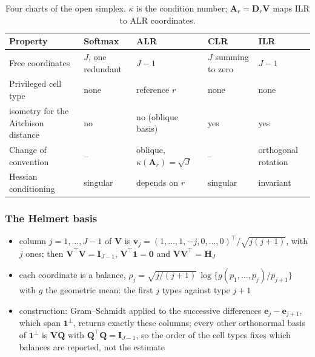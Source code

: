 \begin{table}[ht]
  \centering
  \small
  \caption{Four charts of the open simplex. \(\kappa\) is the condition number; \(\boldsymbol{A}_{r}=\boldsymbol{D}_{r}\mathbf{V}\)
    maps ILR to ALR coordinates.}
  \label{tab:charts}
  \begin{tabular}{@{}>{\raggedright\arraybackslash}p{}>{\raggedright\arraybackslash}p{}>{\raggedright\arraybackslash}p{}>{\raggedright\arraybackslash}p{}>{\raggedright\arraybackslash}p{}@{}}
    \toprule
    Property & Softmax & ALR & CLR & ILR \\
    \midrule
    Free coordinates & \(J\), one redundant & \(J-1\) & \(J\) summing to zero & \(J-1\) \\
    Privileged cell type & none & reference \(r\) & none & none \\
    \Gls{isometry} for the Aitchison distance & no & no (oblique basis) & yes & yes \\
    Change of convention & -- & oblique, \(\kappa(\boldsymbol{A}_{r})=\sqrt{J}\) & -- & orthogonal rotation \\
    Hessian conditioning & singular & depends on \(r\) & singular & invariant \\
    \bottomrule
  \end{tabular}
\end{table}

\subsubsection{The Helmert basis}
\label{app:helmert}

\begin{itemize}
  \item column \(j=1,\ldots,J-1\) of \(\mathbf{V}\) is
        \(\boldsymbol{v}_{j}=(1,\ldots,1,-j,0,\ldots,0)^{\top}/\sqrt{j(j+1)}\), with \(j\) ones; then
        \(\mathbf{V}^{\top}\mathbf{V}=\mathbf{I}_{J-1}\), \(\mathbf{V}^{\top}\mathbf{1}=\boldsymbol{0}\) and \(\mathbf{V}\mathbf{V}^{\top}=\boldsymbol{H}_{J}\)
        \cite{egozcueIsometricLogratioTransformations2003,CoordinateRepresentation2015}
  \item each coordinate is a balance,
        \(\rho_{j}=\sqrt{j/(j+1)}\,\log\{g(p_{1},\ldots,p_{j})/p_{j+1}\}\) with \(g\) the geometric mean: the first \(j\)
        types against type \(j+1\)
  \item construction: Gram--Schmidt applied to the successive differences \(\boldsymbol{e}_{j}-\boldsymbol{e}_{j+1}\), which span
        \(\mathbf{1}^{\perp}\), returns exactly these columns; every other orthonormal basis of \(\mathbf{1}^{\perp}\) is
        \(\mathbf{V}\boldsymbol{Q}\) with \(\boldsymbol{Q}^{\top}\boldsymbol{Q}=\mathbf{I}_{J-1}\), so the order of the cell types fixes which balances
        are reported, not the estimate
\end{itemize}

